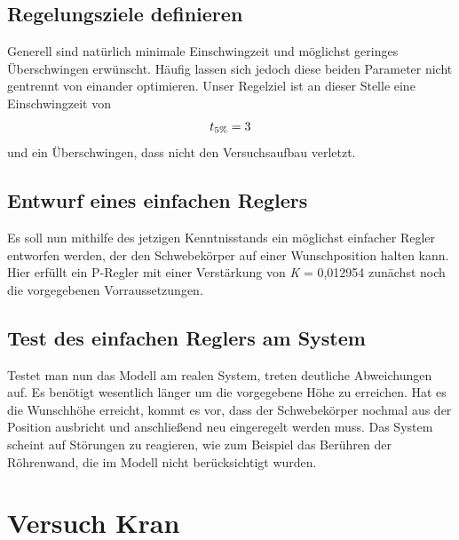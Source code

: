 \documentclass[10pt]{scrartcl}
\begin{document}
\subsection{Regelungsziele definieren}
Generell sind natürlich minimale Einschwingzeit und möglichst geringes Überschwingen erwünscht. Häufig lassen sich jedoch diese beiden Parameter nicht gentrennt von einander optimieren. Unser Regelziel ist an dieser Stelle eine Einschwingzeit von
\begin{align}
t\textsubscript{5\%} = 3
\end{align}
 und ein Überschwingen, dass nicht den Versuchsaufbau verletzt.



\subsection {Entwurf eines einfachen Reglers}
Es soll nun mithilfe des jetzigen Kenntnisstands ein möglichst einfacher Regler entworfen werden, der den Schwebekörper auf einer Wunschposition halten kann. Hier erfüllt ein P-Regler mit einer Verstärkung von \textit K = 0,012954 zunächst noch die vorgegebenen Vorraussetzungen.


\subsection{Test des einfachen Reglers am System}
Testet man nun das Modell am realen System, treten deutliche Abweichungen auf. Es benötigt wesentlich länger um die vorgegebene Höhe zu erreichen. Hat es die Wunschhöhe erreicht, kommt es vor, dass der Schwebekörper nochmal aus der Position ausbricht und anschließend neu eingeregelt werden muss. Das System scheint auf Störungen zu reagieren, wie zum Beispiel das Berühren der Röhrenwand, die im Modell nicht berücksichtigt wurden.


\newpage
\section{Versuch Kran}
\end{document}
